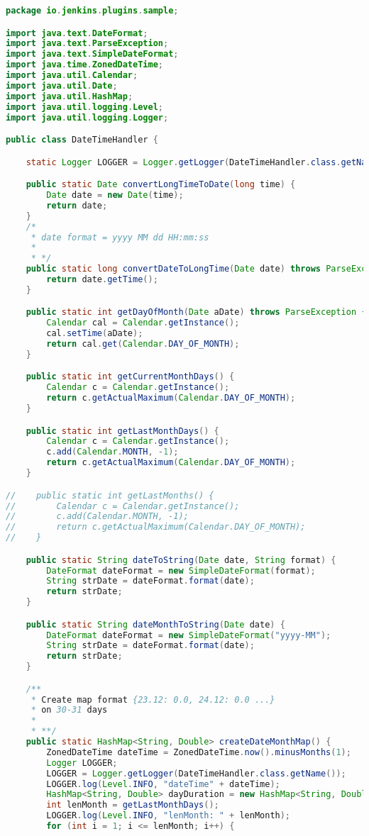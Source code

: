 \begin{lstlisting}[language=Java]
package io.jenkins.plugins.sample;

import java.text.DateFormat;
import java.text.ParseException;
import java.text.SimpleDateFormat;
import java.time.ZonedDateTime;
import java.util.Calendar;
import java.util.Date;
import java.util.HashMap;
import java.util.logging.Level;
import java.util.logging.Logger;

public class DateTimeHandler {

    static Logger LOGGER = Logger.getLogger(DateTimeHandler.class.getName());

    public static Date convertLongTimeToDate(long time) {
        Date date = new Date(time);
        return date;
    }
    /*
     * date format = yyyy MM dd HH:mm:ss
     *
     * */
    public static long convertDateToLongTime(Date date) throws ParseException {
        return date.getTime();
    }

    public static int getDayOfMonth(Date aDate) throws ParseException {
        Calendar cal = Calendar.getInstance();
        cal.setTime(aDate);
        return cal.get(Calendar.DAY_OF_MONTH);
    }

    public static int getCurrentMonthDays() {
        Calendar c = Calendar.getInstance();
        return c.getActualMaximum(Calendar.DAY_OF_MONTH);
    }

    public static int getLastMonthDays() {
        Calendar c = Calendar.getInstance();
        c.add(Calendar.MONTH, -1);
        return c.getActualMaximum(Calendar.DAY_OF_MONTH);
    }

//    public static int getLastMonths() {
//        Calendar c = Calendar.getInstance();
//        c.add(Calendar.MONTH, -1);
//        return c.getActualMaximum(Calendar.DAY_OF_MONTH);
//    }

    public static String dateToString(Date date, String format) {
        DateFormat dateFormat = new SimpleDateFormat(format);
        String strDate = dateFormat.format(date);
        return strDate;
    }

    public static String dateMonthToString(Date date) {
        DateFormat dateFormat = new SimpleDateFormat("yyyy-MM");
        String strDate = dateFormat.format(date);
        return strDate;
    }

    /**
     * Create map format {23.12: 0.0, 24.12: 0.0 ...}
     * on 30-31 days
     *
     * **/
    public static HashMap<String, Double> createDateMonthMap() {
        ZonedDateTime dateTime = ZonedDateTime.now().minusMonths(1);
        Logger LOGGER;
        LOGGER = Logger.getLogger(DateTimeHandler.class.getName());
        LOGGER.log(Level.INFO, "dateTime" + dateTime);
        HashMap<String, Double> dayDuration = new HashMap<String, Double>();
        int lenMonth = getLastMonthDays();
        LOGGER.log(Level.INFO, "lenMonth: " + lenMonth);
        for (int i = 1; i <= lenMonth; i++) {


\end{lstlisting}
